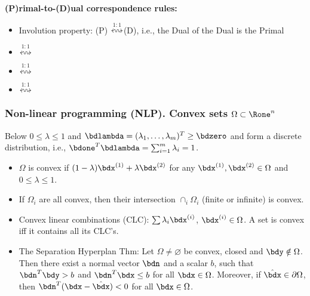 \documentclass[a4paper]{article}
\begin{document}
\bigskip\textbf{(P)rimal-to-(D)ual correspondence rules:}%
\begin{itemize}
  \item Involution property: (P) $\overset{1:1}\leftrightsquigarrow$(D),
    i.e., the Dual of the Dual is the Primal
  \item {} $\overset{1:1}\leftrightsquigarrow$ 
  \item {} $\overset{1:1}\leftrightsquigarrow$
  \item {} $\overset{1:1}\leftrightsquigarrow$
\end{itemize}%


\subsubsection*{Non-linear programming (NLP). Convex sets $\Omega\subset\Rone^n$}%

Below
$0\le \lambda\le 1$ and
$\bdlambda=(\lambda_1,\ldots,\lambda_m)^T\ge\bdzero$
and form a discrete distribution, i.e.,
$\bdone^T\bdlambda=\sum_{i=1}^m \lambda_i=1$.

\begin{itemize}
  \item $\Omega$ is convex if
    $(1-\lambda)\bdx^{(1)}+\lambda\bdx^{(2)}$
    for any
    $\bdx^{(1)},\bdx^{(2)}\in\Omega$ and
    $0\le\lambda\le1$.

  \item If $\Omega_i$ are all convex, then their
    intersection $\cap_i \Omega_i$  (finite or infinite) is convex.

  \item Convex linear combinations (CLC):
    $\sum\lambda_i\bdx^{(i)}$, $\bdx^{(i)}\in\Omega$.
    A set is convex iff it contains all
    its CLC's.

  \item The Separation Hyperplan Thm: Let $\Omega\neq\varnothing$ be convex,
    closed and $\bdy\notin\Omega$.
    Then there exist
    a normal vector $\bdn$ and a scalar $b$, such that $\bdn^T\bdy>b$
    and $\bdn^T\bdx\le b$ for all $\bdx\in\Omega$.
    Moreover, if $\hat\bdx\in\partial\Omega$, then $\bdn^T(\bdx-\hat\bdx)<0$
    for all $\bdx\in\Omega$.
\end{itemize}
\end{document}
